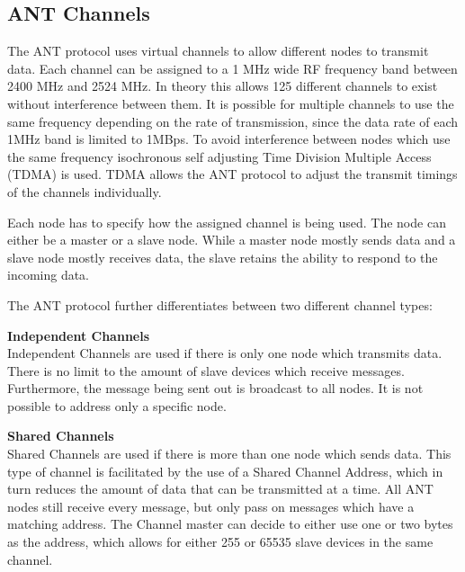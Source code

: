 \subsection{ANT Channels}
\label{sec:ANTchan}
The ANT protocol uses virtual channels to allow different nodes to transmit data. Each channel can be assigned to a 1 MHz wide RF frequency band between 2400 MHz and 2524 MHz.\cite{DynastreamInnovationsInc.2013} In theory this allows 125 different channels to exist without interference between them. It is possible for multiple channels to use the same frequency depending on the rate of transmission, since the data rate of each 1MHz band is limited to 1MBps. 
To avoid interference between nodes which use the same frequency isochronous self adjusting Time Division Multiple Access (TDMA) is used. TDMA allows the ANT protocol to adjust the transmit timings of the channels individually.

Each node has to specify how the assigned channel is being used. The node can either be a master or a slave node. While a master node mostly sends data and a slave node mostly receives data, the slave retains the ability to respond to the incoming data.

The ANT protocol further differentiates between two different channel types:
\begin{description}
	\item{\textbf{Independent Channels}} \hfill \\ Independent Channels are used if there is only one node which transmits data. There is no limit to the amount of slave devices which receive messages. Furthermore, the message being sent out is broadcast to all nodes. It is not possible to address only a specific node.
	
	\item{\textbf{Shared Channels}} \hfill \\ Shared Channels are used if there is more than one node which sends data. This type of channel is facilitated by the use of a Shared Channel Address, which in turn reduces the amount of data that can be transmitted at a time. All ANT nodes still receive every message, but only pass on messages which have a matching address. The Channel master can decide to either use one or two bytes as the address, which allows for either 255 or 65535 slave devices in the same channel. 
\end{description}


